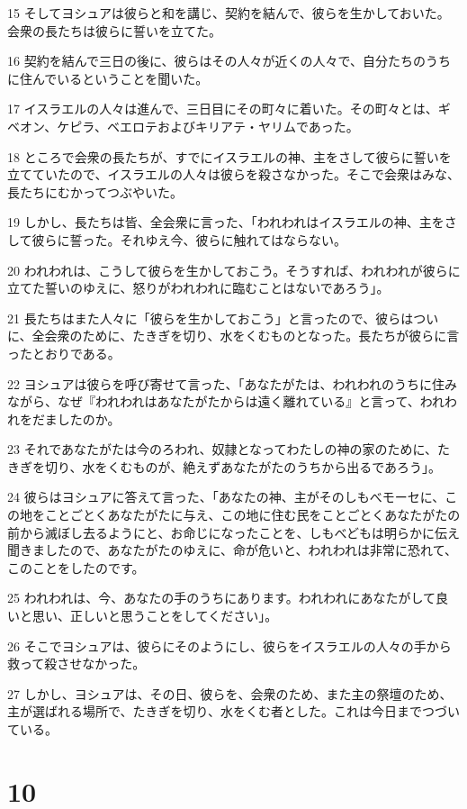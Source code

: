 \par 15 そしてヨシュアは彼らと和を講じ、契約を結んで、彼らを生かしておいた。会衆の長たちは彼らに誓いを立てた。
\par 16 契約を結んで三日の後に、彼らはその人々が近くの人々で、自分たちのうちに住んでいるということを聞いた。
\par 17 イスラエルの人々は進んで、三日目にその町々に着いた。その町々とは、ギベオン、ケピラ、ベエロテおよびキリアテ・ヤリムであった。
\par 18 ところで会衆の長たちが、すでにイスラエルの神、主をさして彼らに誓いを立てていたので、イスラエルの人々は彼らを殺さなかった。そこで会衆はみな、長たちにむかってつぶやいた。
\par 19 しかし、長たちは皆、全会衆に言った、「われわれはイスラエルの神、主をさして彼らに誓った。それゆえ今、彼らに触れてはならない。
\par 20 われわれは、こうして彼らを生かしておこう。そうすれば、われわれが彼らに立てた誓いのゆえに、怒りがわれわれに臨むことはないであろう」。
\par 21 長たちはまた人々に「彼らを生かしておこう」と言ったので、彼らはついに、全会衆のために、たきぎを切り、水をくむものとなった。長たちが彼らに言ったとおりである。
\par 22 ヨシュアは彼らを呼び寄せて言った、「あなたがたは、われわれのうちに住みながら、なぜ『われわれはあなたがたからは遠く離れている』と言って、われわれをだましたのか。
\par 23 それであなたがたは今のろわれ、奴隷となってわたしの神の家のために、たきぎを切り、水をくむものが、絶えずあなたがたのうちから出るであろう」。
\par 24 彼らはヨシュアに答えて言った、「あなたの神、主がそのしもべモーセに、この地をことごとくあなたがたに与え、この地に住む民をことごとくあなたがたの前から滅ぼし去るようにと、お命じになったことを、しもべどもは明らかに伝え聞きましたので、あなたがたのゆえに、命が危いと、われわれは非常に恐れて、このことをしたのです。
\par 25 われわれは、今、あなたの手のうちにあります。われわれにあなたがして良いと思い、正しいと思うことをしてください」。
\par 26 そこでヨシュアは、彼らにそのようにし、彼らをイスラエルの人々の手から救って殺させなかった。
\par 27 しかし、ヨシュアは、その日、彼らを、会衆のため、また主の祭壇のため、主が選ばれる場所で、たきぎを切り、水をくむ者とした。これは今日までつづいている。

\chapter{10}

